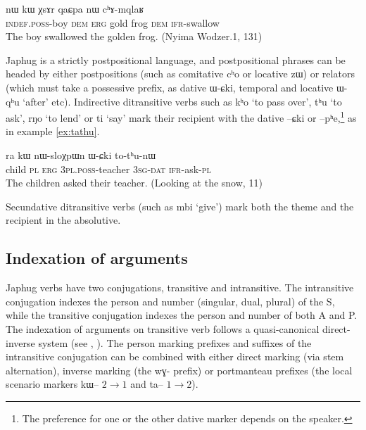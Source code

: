 \documentclass[oldfontcommands,oneside,a4paper,11pt]{article}
\newcommand{\ipa}[1]{{\phon #1}} %
\begin{document}
\begin{exe}
\ex \label{ex:erg}
\gll \ipa{tɤ-tɕɯ}  	\ipa{nɯ}  	\ipa{kɯ}  	\ipa{χsɤr}  	\ipa{qaɕpa}  	\ipa{nɯ}  	\ipa{cʰɤ-mqlaʁ}   \\
\textsc{indef.poss}-boy \textsc{dem} \textsc{erg} gold frog \textsc{dem} \textsc{ifr}-swallow \\
\glt The boy swallowed the golden frog. (Nyima Wodzer.1, 131)
\end{exe}


Japhug is a strictly postpositional language, and postpositional phrases can be headed by either postpositions (such as comitative \ipa{cʰo} or locative \ipa{zɯ}) or relators (which must take a possessive prefix, as dative \ipa{ɯ-ɕki}, temporal and locative  \ipa{ɯ-qʰu} `after' etc). Indirective ditransitive verbs such as \ipa{kʰo} `to pass over', \ipa{tʰu} `to ask', \ipa{rŋo} `to lend' or \ipa{ti} `say' mark their recipient with the dative \ipa{--ɕki} or \ipa{--pʰe},\footnote{The preference for one or the other dative marker depends on the speaker.} as in example \ref{ex:tathu}. 

 \begin{exe}
   \ex   \label{ex:tathu}
 \gll \ipa{tɤpɤtso}  	\ipa{ra}  	\ipa{kɯ}  	\ipa{nɯ-sloχpɯn}  	\ipa{ɯ-ɕki}  	\ipa{to-tʰu-nɯ}  \\
child \textsc{pl} \textsc{erg} \textsc{3pl.poss}-teacher \textsc{3sg-dat} \textsc{ifr}-ask-\textsc{pl} \\
\glt The children asked their teacher. (Looking at the snow, 11)
   \end{exe}  

Secundative  ditransitive verbs (such as \ipa{mbi} `give') mark both the theme and the recipient in the absolutive.
 

\subsection{Indexation of arguments}

Japhug verbs have two conjugations, transitive and intransitive. The intransitive conjugation indexes the person and number (singular, dual, plural) of the S, while the transitive conjugation indexes the person and number of both A and P. The indexation of arguments on transitive verb follows a quasi-canonical direct-inverse system (see \citealt{jacques10inverse}, \citealt{jacques14inverse}). The person marking prefixes and suffixes of the intransitive conjugation can be combined with either direct marking (via stem alternation), inverse marking (the \ipa{wɣ-} prefix) or portmanteau prefixes (the local scenario markers \ipa{kɯ--} $2\rightarrow1$ and \ipa{ta--} $1\rightarrow2$).
\end{document}
